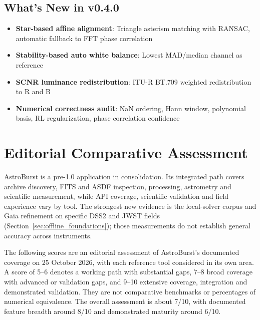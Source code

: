 \documentclass[11pt,a4paper]{article}
\begin{document}
    \subsection{What's New in v0.4.0}
    \begin{itemize}[nosep]
    \item \textbf{Star-based affine alignment}: Triangle asterism matching with RANSAC, automatic fallback to FFT phase correlation
    \item \textbf{Stability-based auto white balance}: Lowest MAD/median channel as reference
    \item \textbf{SCNR luminance redistribution}: ITU-R BT.709 weighted redistribution to R and B
    \item \textbf{Numerical correctness audit}: NaN ordering, Hann window, polynomial basis, RL regularization, phase correlation confidence
    \end{itemize}

    \clearpage
    \section{Editorial Comparative Assessment}
    \label{sec:comparison}

    AstroBurst is a pre-1.0 application in consolidation. Its integrated path covers archive discovery, FITS and ASDF inspection, processing, astrometry and scientific measurement, while API coverage, scientific validation and field experience vary by tool. The strongest new evidence is the local-solver corpus and Gaia refinement on specific DSS2 and JWST fields (Section~\ref{sec:offline_foundations}); those measurements do not establish general accuracy across instruments.

    The following scores are an editorial assessment of AstroBurst's documented coverage on 25 October 2026, with each reference tool considered in its own area. A score of 5--6 denotes a working path with substantial gaps, 7--8 broad coverage with advanced or validation gaps, and 9--10 extensive coverage, integration and demonstrated validation. They are not comparative benchmarks or percentages of numerical equivalence. The overall assessment is about 7/10, with documented feature breadth around 8/10 and demonstrated maturity around 6/10.
\end{document}
